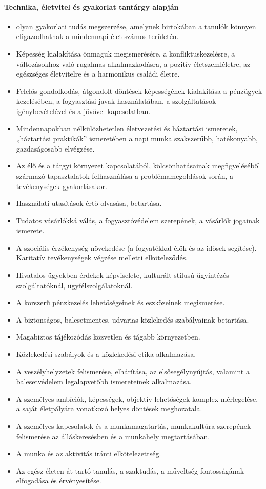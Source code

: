 \paragraph{Technika, életvitel és gyakorlat tantárgy alapján}
\begin{itemize}
\item olyan gyakorlati tudás megszerzése, amelynek birtokában a tanulók könnyen eligazodhatnak a mindennapi élet számos területén.
\item Képesség kialakítása önmaguk megismerésére, a konfliktuskezelésre, a változásokhoz való rugalmas alkalmazkodásra, a pozitív életszemléletre, az egészséges életvitelre és a harmonikus családi életre.
\item Felelős gondolkodás, átgondolt döntések képességének kialakítása a pénzügyek kezelésében, a fogyasztási javak használatában, a szolgáltatások igénybevételével és a jövővel kapcsolatban.
\item Mindennapokban nélkülözhetetlen életvezetési és háztartási ismeretek, „háztartási praktikák” ismeretében a napi munka szakszerűbb, hatékonyabb, gazdaságosabb elvégzése.
\item Az élő és a tárgyi környezet kapcsolatából, kölcsönhatásainak megfigyeléséből származó tapasztalatok felhasználása a problémamegoldások során, a tevékenységek gyakorlásakor.
\item Használati utasítások értő olvasása, betartása.
\item Tudatos vásárlókká válás, a fogyasztóvédelem szerepének, a vásárlók jogainak ismerete.
\item A szociális érzékenység növekedése (a fogyatékkal élők és az idősek segítése). Karitatív tevékenységek végzése melletti elköteleződés.
\item Hivatalos ügyekben érdekek képviselete, kulturált stílusú ügyintézés szolgáltatóknál, ügyfélszolgálatoknál.
\item A korszerű pénzkezelés lehetőségeinek és eszközeinek megismerése.
\item A biztonságos, balesetmentes, udvarias közlekedés szabályainak betartása.
\item Magabiztos tájékozódás közvetlen és tágabb környezetben.
\item Közlekedési szabályok és a közlekedési etika alkalmazása.
\item A veszélyhelyzetek felismerése, elhárítása, az elsősegélynyújtás, valamint a balesetvédelem legalapvetőbb ismereteinek alkalmazása.
\item A személyes ambíciók, képességek, objektív lehetőségek komplex mérlegelése, a saját életpályára vonatkozó helyes döntések meghozatala.
\item A személyes kapcsolatok és a munkamagatartás, munkakultúra szerepének felismerése az álláskeresésben és a munkahely megtartásában.
\item A munka és az aktivitás iránti elkötelezettség.
\item Az egész életen át tartó tanulás, a szaktudás, a műveltség fontosságának elfogadása és érvényesítése.
\end{itemize}
